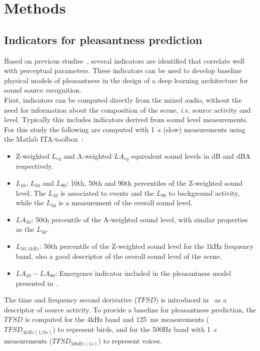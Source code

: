\documentclass[11pt,a4paper]{article}
\begin{document}
\section{Methods}
\label{sec:methods}

\subsection{Indicators for pleasantness prediction}
\label{sec:methods_inds}

Based on previous studies~\cite{aumond2017, gontier2018, ricciardi2014}, several indicators are identified that correlate well with perceptual parameters. These indicators can be used to develop baseline physical models of pleasantness in the design of a deep learning architecture for sound source recognition.\\

First, indicators can be computed directly from the mixed audio, without the need for information about the composition of the scene, \textit{i.e.} source activity and level. Typically this includes indicators derived from sound level measurements. For this study the following are computed with 1~s (slow) measurements using the Matlab ITA-toolbox~\cite{itatoolbox2017}:

\begin{itemize}
\item Z-weighted $L_{eq}$ and A-weighted $LA_{eq}$ equivalent sound levels in dB and dBA respectively.
\item $L_{10}$, $L_{50}$ and $L_{90}$: 10th, 50th and 90th percentiles of the Z-weighted sound level. The $L_{10}$ is associated to events and the $L_{90}$ to background activity, while the $L_{50}$ is a measurement of the overall sound level.
\item $LA_{50}$: 50th percentile of the A-weighted sound level, with similar properties as the $L_{50}$.
\item $L_{50, 1kHz}$: 50th percentile of the Z-weighted sound level for the 1kHz frequency band, also a good descriptor of the overall sound level of the scene.
\item $LA_{10}-LA_{90}$: Emergence indicator included in the pleasantness model presented in~\cite{ricciardi2014}.
\end{itemize}

The time and frequency second derivative ($TFSD$) is introduced in~\cite{aumond2017} as a descriptor of source activity. To provide a baseline for pleasantness prediction, the $TFSD$ is computed for the 4kHz band and 125~ms measurements ($TFSD_{4kHz(1/8s)}$) to represent birds, and for the 500Hz band with 1~s measurements ($TFSD_{500Hz(1s)}$) to represent voices.\\
\end{document}
